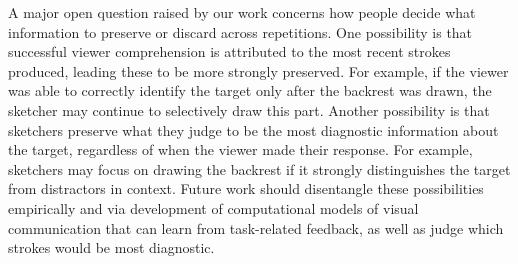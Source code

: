 A major open question raised by our work concerns how people decide what information to preserve or discard across repetitions.
One possibility is that successful viewer comprehension is attributed to the most recent strokes produced, leading these to be more strongly preserved.
For example, if the viewer was able to correctly identify the target only after the backrest was drawn, the sketcher may continue to selectively draw this part.
Another possibility is that sketchers preserve what they judge to be the most diagnostic information about the target, regardless of when the viewer made their response.
For example, sketchers may focus on drawing the backrest if it strongly distinguishes the target from distractors in context.
Future work should disentangle these possibilities empirically and via development of computational models of visual communication that can learn from task-related feedback, as well as judge which strokes would be most diagnostic.




